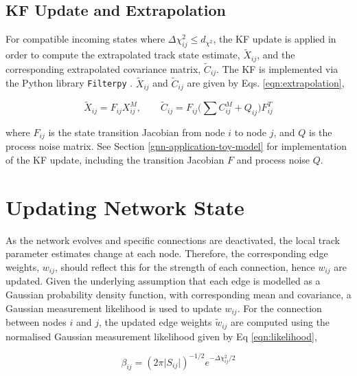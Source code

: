 \subsection{KF Update and Extrapolation}
\label{chapter-5-kf-extrapolation}

For compatible incoming states where $\Delta \chi^{2}_{ij} \leq d_{\chi^{2}}$, the KF update is applied in order to compute the extrapolated track state estimate, $\tilde{X}_{ij}$, and the corresponding extrapolated covariance matrix, $\widetilde{C}_{ij}$. The KF is implemented via the Python library \texttt{Filterpy} \cite{filterpy}. $\tilde{X}_{ij}$ and $\widetilde{C}_{ij}$ are given by Eqs. \eqref{eqn:extrapolation},

\begin{equation}
\tilde{X}_{ij} = F_{ij} X_{ij}^{M}, \qquad \tilde{C}_{ij} = F_{ij} \biggl( \sum C_{ij}^{M} + Q_{ij} \biggl) F^{T}_{ij}
\label{eqn:extrapolation}
\end{equation}

where $F_{ij}$ is the state transition Jacobian from node $i$ to node $j$, and $Q$ is the process noise matrix. See Section \ref{gnn-application-toy-model} for implementation of the KF update, including the transition Jacobian $F$ and process noise $Q$. 






\section{Updating Network State}
\label{gnn-updating-network-state}

As the network evolves and specific connections are deactivated, the local track parameter estimates change at each node. Therefore, the corresponding edge weights, $w_{ij}$, should reflect this for the strength of each connection, hence $w_{ij}$ are updated. Given the underlying assumption that each edge is modelled as a Gaussian probability density function, with corresponding mean and covariance, a Gaussian measurement likelihood is used to update $w_{ij}$. For the connection between nodes $i$ and $j$, the updated edge weights $\widetilde{w}_{ij}$ are computed using the normalised Gaussian measurement likelihood given by Eq \eqref{eqn:likelihood}, 

\begin{equation}
\beta_{ij} = (2 \pi \lvert S_{ij} \rvert )^{-1/2}  e^{-\Delta \chi^{2}_{ij} / 2}
\label{eqn:likelihood}
\end{equation}

